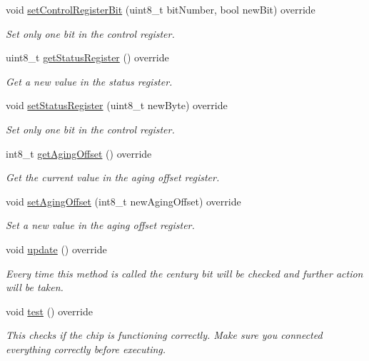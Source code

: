 \begin{DoxyCompactItemize}
void \mbox{\hyperlink{class_d_s3231_a9ed1255adb58ecd03a541a4d481496c4}{set\+Control\+Register\+Bit}} (uint8\+\_\+t bit\+Number, bool new\+Bit) override
\begin{DoxyCompactList}\small\item\em Set only one bit in the control register. \end{DoxyCompactList}\item 
uint8\+\_\+t \mbox{\hyperlink{class_d_s3231_aee77c6ecb3c292d375eebe7e58ebb024}{get\+Status\+Register}} () override
\begin{DoxyCompactList}\small\item\em Get a new value in the status register. \end{DoxyCompactList}\item 
void \mbox{\hyperlink{class_d_s3231_a303a9a5123f66987e209396d60e329e8}{set\+Status\+Register}} (uint8\+\_\+t new\+Byte) override
\begin{DoxyCompactList}\small\item\em Set only one bit in the control register. \end{DoxyCompactList}\item 
int8\+\_\+t \mbox{\hyperlink{class_d_s3231_a94e9f40f1b453dc4d8894b63bc0ec7d6}{get\+Aging\+Offset}} () override
\begin{DoxyCompactList}\small\item\em Get the current value in the aging offset register. \end{DoxyCompactList}\item 
void \mbox{\hyperlink{class_d_s3231_a0a9dc2668139654b261c2feeb1d6e663}{set\+Aging\+Offset}} (int8\+\_\+t new\+Aging\+Offset) override
\begin{DoxyCompactList}\small\item\em Set a new value in the aging offset register. \end{DoxyCompactList}\item 
void \mbox{\hyperlink{class_d_s3231_a143ec57122d892ea0ec671a153352f2c}{update}} () override
\begin{DoxyCompactList}\small\item\em Every time this method is called the century bit will be checked and further action will be taken. \end{DoxyCompactList}\item 
void \mbox{\hyperlink{class_d_s3231_aba65d7463036207d2a7c879d34dc827e}{test}} () override
\begin{DoxyCompactList}\small\item\em This checks if the chip is functioning correctly. Make sure you connected everything correctly before executing. \end{DoxyCompactList}\end{DoxyCompactItemize}
